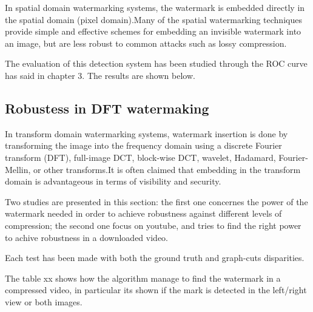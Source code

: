 In spatial domain watermarking systems, the watermark is embedded directly in the spatial domain (pixel domain).\newline  Many of the spatial watermarking techniques provide simple and effective schemes for embedding an invisible watermark into an image, but are less robust to common attacks such as lossy compression.

The evaluation of this detection system has been studied through the ROC curve has said in chapter 3. The results are shown below.

\subsection{Robustess in DFT watermaking}

In transform domain watermarking systems, watermark insertion is done by transforming the image into the frequency domain using a discrete Fourier transform (DFT), full-image DCT, block-wise DCT, wavelet, Hadamard, Fourier-Mellin, or other transforms.\newline  It is often claimed that embedding in the transform domain is advantageous in terms of visibility and security.\newline 

Two studies are presented in this section: the first one concernes the power of the watermark needed in order to achieve robustness against different levels of compression; the second one focus on youtube, and tries to find the right power to achive robustness in a downloaded video.\newline 

Each test has been made with both the ground truth and graph-cuts disparities.\newline 

The table xx shows how the algorithm manage to find the watermark in a compressed video, in particular its shown if the mark is detected in the left/right view or both images.


\begin{table}[htbp]
 \label{Tab:compgt}
 \begin{center}
 \caption{}
 \end{center}
 \end{table}
 
